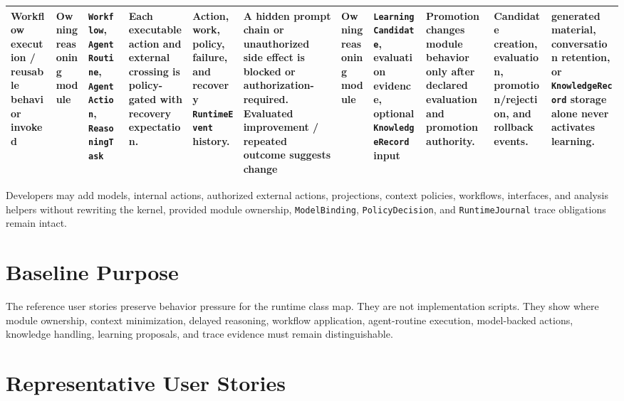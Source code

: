 {\begin{tabularx}{\linewidth}{@{}p{1.8cm}p{2.2cm}p{2.2cm}X X X@{}}
	Workflow execution / reusable behavior invoked & Owning reasoning module & \texttt{Workflow}, \texttt{AgentRoutine}, \texttt{AgentAction}, \texttt{ReasoningTask} & Each executable action and external crossing is policy-gated with recovery expectation. & Action, work, policy, failure, and recovery \texttt{RuntimeEvent} history. & A hidden prompt chain or unauthorized side effect is blocked or authorization-required. \N
	Evaluated improvement / repeated outcome suggests change & Owning reasoning module & \texttt{LearningCandidate}, evaluation evidence, optional \texttt{KnowledgeRecord} input & Promotion changes module behavior only after declared evaluation and promotion authority. & Candidate creation, evaluation, promotion/rejection, and rollback events. & generated material, conversation retention, or \texttt{KnowledgeRecord} storage alone never activates learning. \\
	\bottomrule
\end{tabularx}
\normalsize
}\n

Developers may add models, internal actions, authorized external actions, projections, context policies, workflows, interfaces, and analysis helpers without rewriting the kernel, provided module ownership, \texttt{ModelBinding}, \texttt{PolicyDecision}, and \texttt{RuntimeJournal} trace obligations remain intact.


\section{Baseline Purpose}

The reference user stories preserve behavior pressure for the runtime class map. They are not implementation scripts. They show where module ownership, context minimization, delayed reasoning, workflow application, agent-routine execution, model-backed actions, knowledge handling, learning proposals, and trace evidence must remain distinguishable.\n

\section{Representative User Stories}


